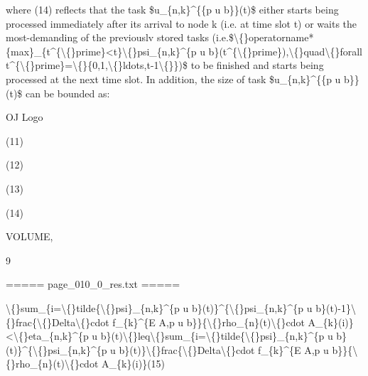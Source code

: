\documentclass{article}
\begin{document}
where (14) reflects that the task \$u\_\{n,k\}\textasciicircum{}\{\{p u b\}\}(t)\$ either starts being processed immediately after its arrival to node k (i.e. at time slot t) or waits the most-demanding of the previouslv stored tasks (i.e.\$\textbackslash\{\}operatorname*\{max\}\_\{t\textasciicircum{}\{\textbackslash\{\}prime\}<t\}\textbackslash\{\}psi\_\{n,k\}\textasciicircum{}\{p u b\}(t\textasciicircum{}\{\textbackslash\{\}prime\}),\textbackslash\{\}quad\textbackslash\{\}forall t\textasciicircum{}\{\textbackslash\{\}prime\}=\textbackslash\{\}\{0,1,\textbackslash\{\}ldots,t-1\textbackslash\{\}\})\$ to be finished and starts being processed at the next time slot. In addition, the size of task \$u\_\{n,k\}\textasciicircum{}\{\{p u b\}\}(t)\$ can be bounded as:

OJ Logo

(11)

(12)

(13)

(14)

VOLUME,

9

===== page\_010\_0\_res.txt =====


\textbackslash\{\}sum\_\{i=\textbackslash\{\}tilde\{\textbackslash\{\}psi\}\_\{n,k\}\textasciicircum{}\{p u b\}(t)\}\textasciicircum{}\{\textbackslash\{\}psi\_\{n,k\}\textasciicircum{}\{p u b\}(t)-1\}\textbackslash\{\}frac\{\textbackslash\{\}Delta\textbackslash\{\}cdot f\_\{k\}\textasciicircum{}\{E A,p u b\}\}\{\textbackslash\{\}rho\_\{n\}(t)\textbackslash\{\}cdot A\_\{k\}(i)\}<\textbackslash\{\}eta\_\{n,k\}\textasciicircum{}\{p u b\}(t)\textbackslash\{\}leq\textbackslash\{\}sum\_\{i=\textbackslash\{\}tilde\{\textbackslash\{\}psi\}\_\{n,k\}\textasciicircum{}\{p u b\}(t)\}\textasciicircum{}\{\textbackslash\{\}psi\_\{n,k\}\textasciicircum{}\{p u b\}(t)\}\textbackslash\{\}frac\{\textbackslash\{\}Delta\textbackslash\{\}cdot f\_\{k\}\textasciicircum{}\{E A,p u b\}\}\{\textbackslash\{\}rho\_\{n\}(t)\textbackslash\{\}cdot A\_\{k\}(i)\}(15)
\end{document}
